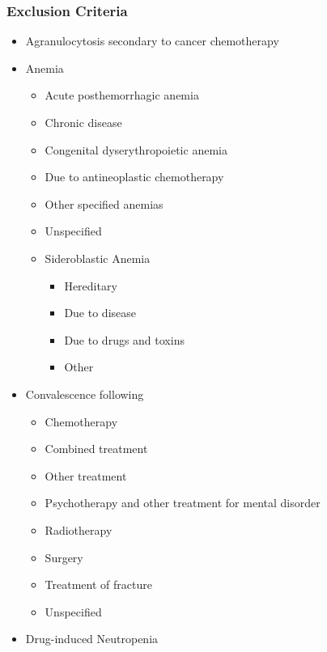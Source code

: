 \subsubsection{Exclusion Criteria}

\begin{itemize}
    \item Agranulocytosis secondary to cancer chemotherapy
    
    \item Anemia
    \begin{itemize}
        \item Acute posthemorrhagic anemia
        \item Chronic disease
        \item Congenital dyserythropoietic anemia
        \item Due to antineoplastic chemotherapy
        \item Other specified anemias
        \item Unspecified
        
        \item Sideroblastic Anemia
        \begin{itemize}
            \item Hereditary
            \item Due to disease
            \item Due to drugs and toxins
            \item Other
        \end{itemize}
    \end{itemize}
    
    \item Convalescence following
    \begin{itemize}
        \item Chemotherapy
        \item Combined treatment
        \item Other treatment
        \item Psychotherapy and other treatment for mental disorder
        \item Radiotherapy
        \item Surgery
        \item Treatment of fracture
        \item Unspecified
    \end{itemize}
    
    \item Drug-induced Neutropenia
    

\end{itemize}
